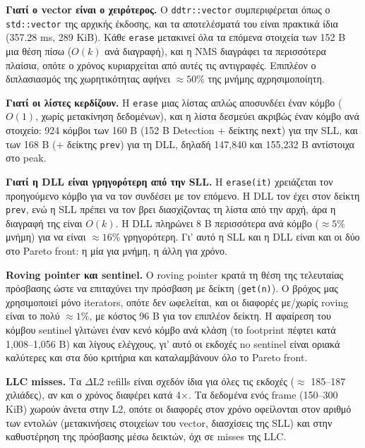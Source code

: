 \documentclass[11pt,a4paper]{article}
\newcommand{\en}[1]{\textlatin{#1}}
\begin{document}
\textbf{Γιατί ο \en{vector} είναι ο χειρότερος.} Ο \en{\texttt{ddtr::vector}} συμπεριφέρεται όπως ο \en{\texttt{std::vector}} της αρχικής έκδοσης, και τα αποτελέσματά του είναι πρακτικά ίδια (357.28 \en{ms}, 289 \en{KiB}). Κάθε \en{\texttt{erase}} μετακινεί όλα τα επόμενα στοιχεία των 152 \en{B} μια θέση πίσω ($O(k)$ ανά διαγραφή), και η \en{NMS} διαγράφει τα περισσότερα πλαίσια, οπότε ο χρόνος κυριαρχείται από αυτές τις αντιγραφές. Επιπλέον ο διπλασιασμός της χωρητικότητας αφήνει $\approx 50\%$ της μνήμης αχρησιμοποίητη.

\textbf{Γιατί οι λίστες κερδίζουν.} Η \en{\texttt{erase}} μιας λίστας απλώς αποσυνδέει έναν κόμβο ($O(1)$, χωρίς μετακίνηση δεδομένων), και η λίστα δεσμεύει ακριβώς έναν κόμβο ανά στοιχείο: 924 κόμβοι των 160 \en{B} (152 \en{B} \en{Detection} + δείκτης \en{\texttt{next}}) για την \en{SLL}, και των 168 \en{B} (+ δείκτης \en{\texttt{prev}}) για τη \en{DLL}, δηλαδή 147{,}840 και 155{,}232 \en{B} αντίστοιχα στο \en{peak}.

\textbf{Γιατί η \en{DLL} είναι γρηγορότερη από την \en{SLL}.} Η \en{\texttt{erase(it)}} χρειάζεται τον προηγούμενο κόμβο για να τον συνδέσει με τον επόμενο. Η \en{DLL} τον έχει στον δείκτη \en{\texttt{prev}}, ενώ η \en{SLL} πρέπει να τον βρει διασχίζοντας τη λίστα από την αρχή, άρα η διαγραφή της είναι $O(k)$. Η \en{DLL} πληρώνει 8 \en{B} περισσότερα ανά κόμβο ($\approx 5\%$ μνήμη) για να είναι $\approx 16\%$ γρηγορότερη. Γι' αυτό η \en{SLL} και η \en{DLL} είναι και οι δύο στο \en{Pareto front}: η μία για μνήμη, η άλλη για χρόνο.

\textbf{\en{Roving pointer} και \en{sentinel}.} Ο \en{roving pointer} κρατά τη θέση της τελευταίας πρόσβασης ώστε να επιταχύνει την πρόσβαση με δείκτη (\en{\texttt{get(n)}}). Ο βρόχος μας χρησιμοποιεί μόνο \en{iterators}, οπότε δεν ωφελείται, και οι διαφορές με/χωρίς \en{roving} είναι το πολύ $\approx 1\%$, με κόστος 96 \en{B} για τον επιπλέον δείκτη. Η αφαίρεση του κόμβου \en{sentinel} γλιτώνει έναν κενό κόμβο ανά κλάση (το \en{footprint} πέφτει κατά 1{,}008--1{,}056 \en{B}) και λίγους ελέγχους, γι' αυτό οι εκδοχές \en{no sentinel} είναι οριακά καλύτερες και στα δύο κριτήρια και καταλαμβάνουν όλο το \en{Pareto front}.

\textbf{\en{LLC misses}.} Τα \en{$\Delta$L2 refills} είναι σχεδόν ίδια για όλες τις εκδοχές ($\approx$ 185--187 χιλιάδες), αν και ο χρόνος διαφέρει κατά 4$\times$. Τα δεδομένα ενός \en{frame} (150--300 \en{KiB}) χωρούν άνετα στην \en{L2}, οπότε οι διαφορές στον χρόνο οφείλονται στον αριθμό των εντολών (μετακινήσεις στοιχείων του \en{vector}, διασχίσεις της \en{SLL}) και στην καθυστέρηση της πρόσβασης μέσω δεικτών, όχι σε \en{misses} της \en{LLC}.
\end{document}
